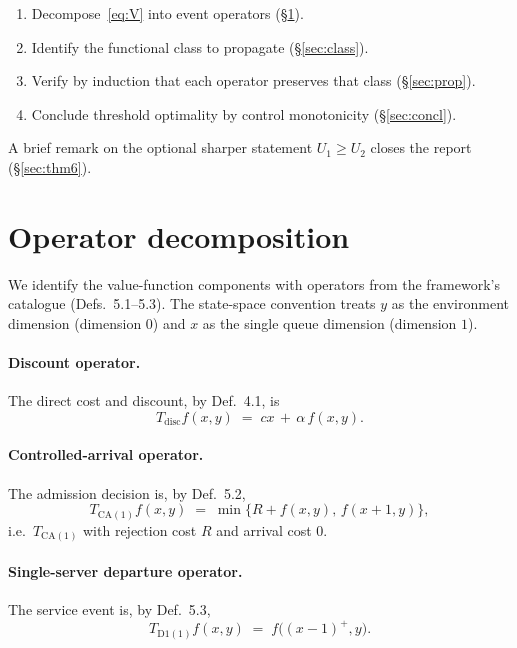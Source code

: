 \documentclass[11pt,a4paper]{article}
\newcommand{\Tdisc}{T_{\mathrm{disc}}}
\newcommand{\Tca}{T_{\mathrm{CA}(1)}}
\newcommand{\Td}{T_{\mathrm{D1}(1)}}
\theoremstyle{definition}
\begin{document}
\begin{enumerate}[leftmargin=2em, itemsep=0pt]
    \item Decompose~\eqref{eq:V} into event operators (\S\ref{sec:decomp}).
    \item Identify the functional class to propagate
        (\S\ref{sec:class}).
    \item Verify by induction that each operator preserves that class
        (\S\ref{sec:prop}).
    \item Conclude threshold optimality by control monotonicity
        (\S\ref{sec:concl}).
\end{enumerate}

A brief remark on the optional sharper statement $U_1 \ge U_2$ closes
the report (\S\ref{sec:thm6}).

\section{Operator decomposition}
\label{sec:decomp}

We identify the value-function components with operators from the
framework's catalogue (Defs.~5.1--5.3). The state-space convention
treats $y$ as the environment dimension (dimension $0$) and $x$ as
the single queue dimension (dimension $1$).

\paragraph{Discount operator.}
The direct cost and discount, by Def.~4.1, is
\[
    \Tdisc f(x, y) \;=\; cx \,+\, \alpha\, f(x, y).
\]

\paragraph{Controlled-arrival operator.}
The admission decision is, by Def.~5.2,
\[
    \Tca f(x, y) \;=\; \min\{R + f(x, y),\, f(x + 1, y)\},
\]
i.e.\ $\Tca$ with rejection cost $R$ and arrival cost $0$.

\paragraph{Single-server departure operator.}
The service event is, by Def.~5.3,
\[
    \Td f(x, y) \;=\; f\big((x - 1)^+, y\big).
\]
\end{document}
